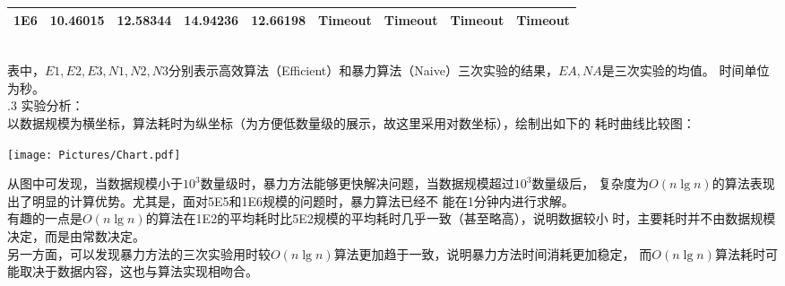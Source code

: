 \documentclass[a4paper]{article}
\begin{document}
\begin{enumerate}
{\begin{tabular}{c||ccc|c||ccc|c}
    1E6&10.46015 &12.58344 &14.94236 &12.66198  &Timeout &Timeout &Timeout &Timeout\\
    \hline\hline
  \end{tabular}
  }\\
  \medskip
  表中，$E1,E2,E3,N1,N2,N3$分别表示高效算法（Efficient）和暴力算法（Naive）三次实验的结果，$EA,NA$是三次实验的均值。
  时间单位为秒。\\
  .3 实验分析：\\
  以数据规模为横坐标，算法耗时为纵坐标（为方便低数量级的展示，故这里采用对数坐标），绘制出如下的
  耗时曲线比较图：
  \begin{center}
    \texttt{[image: Pictures/Chart.pdf]}
  \end{center}
  从图中可发现，当数据规模小于$10^3$数量级时，暴力方法能够更快解决问题，当数据规模超过$10^3$数量级后，
  复杂度为$O(n \lg n)$的算法表现出了明显的计算优势。尤其是，面对5E5和1E6规模的问题时，暴力算法已经不
  能在1分钟内进行求解。\\
  有趣的一点是$O(n \lg n)$的算法在1E2的平均耗时比5E2规模的平均耗时几乎一致（甚至略高），说明数据较小
  时，主要耗时并不由数据规模决定，而是由常数决定。\\
  另一方面，可以发现暴力方法的三次实验用时较$O(n \lg n)$算法更加趋于一致，说明暴力方法时间消耗更加稳定，
  而$O(n \lg n)$算法耗时可能取决于数据内容，这也与算法实现相吻合。
\end{enumerate}
\end{document}
